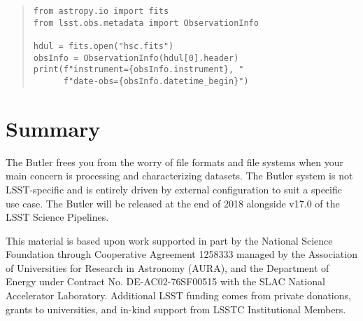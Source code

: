 \documentclass[11pt,twoside]{article}
\begin{document}
\begin{quote}
\begin{small}
\begin{verbatim}
from astropy.io import fits
from lsst.obs.metadata import ObservationInfo

hdul = fits.open("hsc.fits")
obsInfo = ObservationInfo(hdul[0].header)
print(f"instrument={obsInfo.instrument}, "
      f"date-obs={obsInfo.datetime_begin}")
\end{verbatim}
\end{small}
\end{quote}

\section{Summary}

The Butler frees you from the worry of file formats and file systems when your main concern is processing and characterizing datasets.
The Butler system is not LSST-specific and is entirely driven by external configuration to suit a specific use case.
The Butler will be released at the end of 2018 alongside v17.0 of the LSST Science Pipelines.


\acknowledgements This material is based upon work supported in part by the National Science Foundation through Cooperative Agreement 1258333 managed by the Association of Universities for Research in Astronomy (AURA), and the Department of Energy under Contract No. DE-AC02-76SF00515 with the SLAC National Accelerator Laboratory.
Additional LSST funding comes from private donations, grants to universities, and in-kind support from LSSTC Institutional Members.

\end{document}
